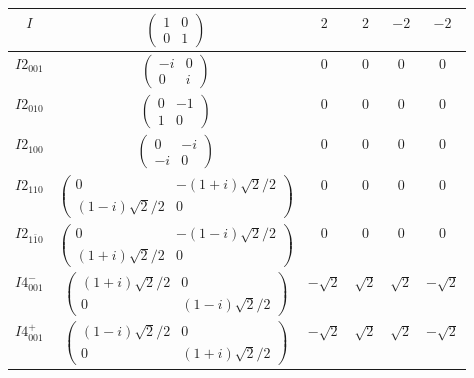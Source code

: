 \documentclass[3p,preprint]{elsarticle}
\begin{document}
\begin{table}[H]
\begin{tabular}{|c|c||c|c|c|c|}
		$I$ & 				$\left(\begin{array}{cc} 1&0 \\ 0&1 \end{array}\right)$	& $2$ &  $2$ & $-2$ & $-2$ \\ \hline
		$I2_{001}$ &		$\left(\begin{array}{cc} -i&0 \\ 0&i \end{array}\right)$	& $0$ & $0$ & $0$ & $0$  \\ \hline
		$I2_{010}$ &		$\left(\begin{array}{cc} 0&-1 \\ 1&0 \end{array}\right)$	&$0$ & $0$ & $0$ & $0$  \\ \hline
		$I2_{100}$ &		$\left(\begin{array}{cc} 0&-i \\ -i&0 \end{array}\right)$	& $0$ & $0$ & $0$ & $0$  \\ \hline
		$I2_{110}$ &		$\left(\begin{array}{cc} 0&-(1+i)\sqrt{2}/2 \\ (1-i)\sqrt{2}/2&0 \end{array}\right)$	&$0$ & $0$ & $0$ & $0$  \\ \hline
		$I2_{1\bar{1}0}$ &		$\left(\begin{array}{cc} 0&-(1-i)\sqrt{2}/2 \\ (1+i)\sqrt{2}/2&0 \end{array}\right)$	& $0$ & $0$ & $0$ & $0$  \\ \hline
		$I4^{-}_{001}$ &		$\left(\begin{array}{cc} (1+i)\sqrt{2}/2&0 \\ 0&(1-i)\sqrt{2}/2 \end{array}\right)$	& $-\sqrt{2}$ & $\sqrt{2}$ & $\sqrt{2}$ & $-\sqrt{2}$  \\ \hline
		$I4^{+}_{001}$ &		$\left(\begin{array}{cc} (1-i)\sqrt{2}/2&0 \\ 0&(1+i)\sqrt{2}/2 \end{array}\right)$	& $-\sqrt{2}$ & $\sqrt{2}$ & $\sqrt{2}$ & $-\sqrt{2}$  \\ \hline
		
	\end{tabular}
\end{table}
\end{document}
